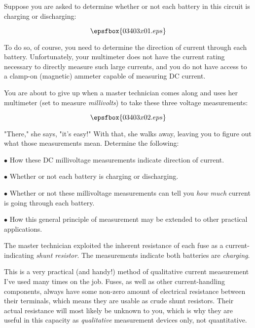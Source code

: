 

Suppose you are asked to determine whether or not each battery in this circuit is charging or discharging:

$$\epsfbox{03403x01.eps}$$

To do so, of course, you need to determine the direction of current through each battery.  Unfortunately, your multimeter does not have the current rating necessary to directly measure such large currents, and you do not have access to a clamp-on (magnetic) ammeter capable of measuring DC current.

\goodbreak

You are about to give up when a master technician comes along and uses her multimeter (set to measure {\it millivolts}) to take these three voltage measurements:

$$\epsfbox{03403x02.eps}$$

"There," she says, "it's easy!" With that, she walks away, leaving you to figure out what those measurements mean.  Determine the following:

\medskip
\item{$\bullet$} How these DC millivoltage measurements indicate direction of current.
\item{$\bullet$} Whether or not each battery is charging or discharging.
\item{$\bullet$} Whether or not these millivoltage measurements can tell you {\it how much} current is going through each battery.
\item{$\bullet$} How this general principle of measurement may be extended to other practical applications.
\medskip







The master technician exploited the inherent resistance of each fuse as a current-indicating {\it shunt resistor}.  The measurements indicate both batteries are {\it charging}.







This is a very practical (and handy!) method of qualitative current measurement I've used many times on the job.  Fuses, as well as other current-handling components, always have some non-zero amount of electrical resistance between their terminals, which means they are usable as crude shunt resistors.  Their actual resistance will most likely be unknown to you, which is why they are useful in this capacity as {\it qualitative} measurement devices only, not quantitative.

